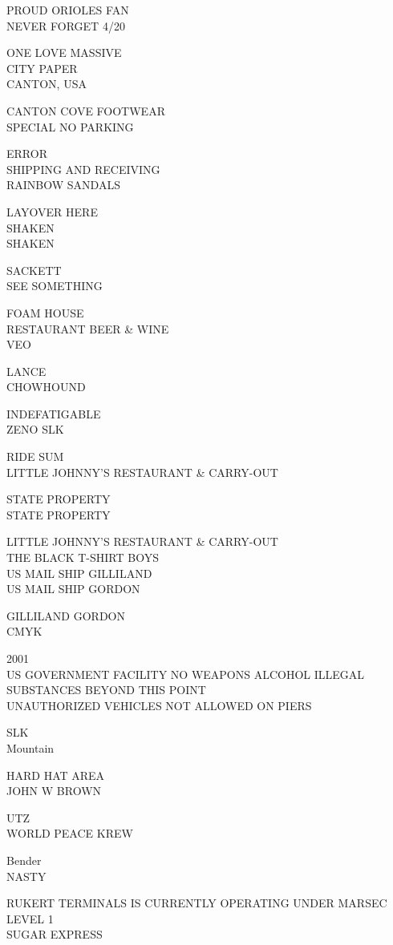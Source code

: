 \documentclass[10pt,letterpaper]{article}
\begin{document}
PROUD ORIOLES FAN\\
NEVER FORGET 4/20

ONE LOVE MASSIVE\\
CITY PAPER\\
CANTON, USA

CANTON COVE FOOTWEAR\\
SPECIAL NO PARKING

ERROR\\
SHIPPING AND RECEIVING\\
RAINBOW SANDALS

LAYOVER HERE\\
SHAKEN\\
SHAKEN

SACKETT\\
SEE SOMETHING

FOAM HOUSE\\
RESTAURANT BEER \& WINE\\
VEO

LANCE\\
CHOWHOUND

INDEFATIGABLE\\
ZENO SLK

RIDE SUM\\
LITTLE JOHNNY'S RESTAURANT \& CARRY{-}OUT

STATE PROPERTY\\
STATE PROPERTY

LITTLE JOHNNY'S RESTAURANT \& CARRY{-}OUT\\
THE BLACK T{-}SHIRT BOYS\\
US MAIL SHIP GILLILAND\\
US MAIL SHIP GORDON

GILLILAND GORDON\\
CMYK

2001\\
US GOVERNMENT FACILITY NO WEAPONS ALCOHOL ILLEGAL SUBSTANCES BEYOND THIS POINT\\
UNAUTHORIZED VEHICLES NOT ALLOWED ON PIERS

SLK\\
Mountain

HARD HAT AREA\\
JOHN W BROWN

UTZ\\
WORLD PEACE KREW

Bender\\
NASTY

RUKERT TERMINALS IS CURRENTLY OPERATING UNDER MARSEC LEVEL 1\\
SUGAR EXPRESS
\end{document}
